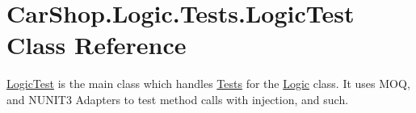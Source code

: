 \hypertarget{class_car_shop_1_1_logic_1_1_tests_1_1_logic_test}{}\section{Car\+Shop.\+Logic.\+Tests.\+Logic\+Test Class Reference}
\label{class_car_shop_1_1_logic_1_1_tests_1_1_logic_test}


\mbox{\hyperlink{class_car_shop_1_1_logic_1_1_tests_1_1_logic_test}{Logic\+Test}} is the main class which handles \mbox{\hyperlink{namespace_car_shop_1_1_logic_1_1_tests}{Tests}} for the \mbox{\hyperlink{class_car_shop_1_1_logic_1_1_logic}{Logic}} class. It uses M\+OQ, and N\+U\+N\+I\+T3 Adapters to test method calls with injection, and such.  


